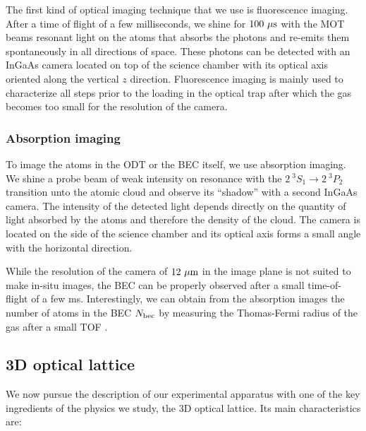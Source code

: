 The first kind of optical imaging technique that we use is fluorescence imaging. After a time of flight of a few milliseconds, we shine for $100 \ \mu \rm{s}$ with the MOT beams resonant light on the atoms that absorbs the photons and re-emits them spontaneously in all directions of space. These photons can be detected with an InGaAs camera located on top of the science chamber with its optical axis oriented along the vertical $z$ direction. Fluorescence imaging is mainly used to characterize all steps prior to the loading in the optical trap after which the gas becomes too small for the resolution of the camera.
 
\subsubsection{Absorption imaging}

To image the atoms in the ODT or the BEC itself, we use absorption imaging. We shine a probe beam of weak intensity on resonance with the $2 \ ^3 S_1 \rightarrow 2 \ ^3 P_2$ transition unto the atomic cloud and observe its ``shadow'' with a second InGaAs camera. The intensity of the detected light depends directly on the quantity of light absorbed by the atoms and therefore the density of the cloud. The camera is located on the side of the science chamber and its optical axis forms a small angle with the horizontal direction.

While the resolution of the camera of $12 \ \mu \rm{m}$ in the image plane is not suited to make in-situ images, the BEC can be properly observed after a small time-of-flight of a few ms. Interestingly, we can obtain from the absorption images the number of atoms in the BEC $N_{\rm{bec}}$ by measuring the Thomas-Fermi radius of the gas after a small TOF \cite{bouton_these}.



\subsection{3D optical lattice}

We now pursue the description of our experimental apparatus with one of the key ingredients of the physics we study, the 3D optical lattice. Its main characteristics are: 


